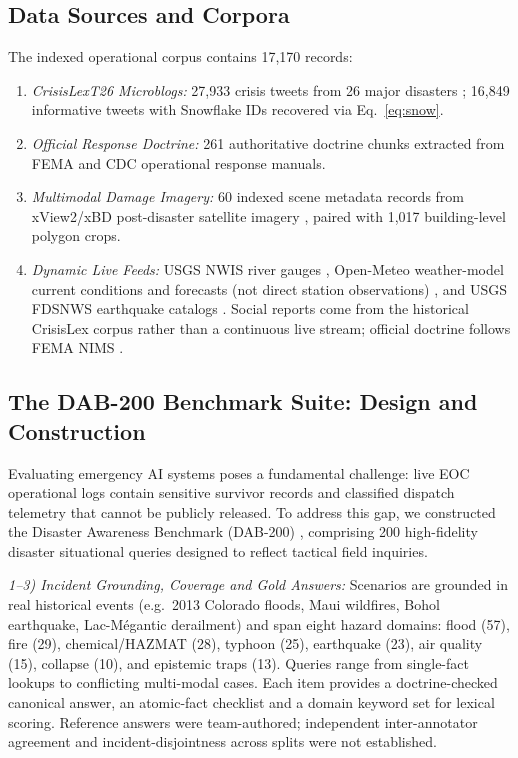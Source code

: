 \documentclass[conference]{IEEEtran}
\begin{document}
\subsection{Data Sources and Corpora}
The indexed operational corpus contains 17,170 records:
\begin{enumerate}
    \item \textit{CrisisLexT26 Microblogs:} 27,933 crisis tweets from 26 major disasters \cite{olteanu2015}; 16,849 informative tweets with Snowflake IDs recovered via Eq.~\eqref{eq:snow}.
    \item \textit{Official Response Doctrine:} 261 authoritative doctrine chunks extracted from FEMA and CDC operational response manuals.
    \item \textit{Multimodal Damage Imagery:} 60 indexed scene metadata records from xView2/xBD post-disaster satellite imagery \cite{xview2}, paired with 1,017 building-level polygon crops.
    \item \textit{Dynamic Live Feeds:} USGS NWIS river gauges \cite{usgsnwis}, Open-Meteo weather-model current conditions and forecasts (not direct station observations) \cite{openmeteo}, and USGS FDSNWS earthquake catalogs \cite{usgsfdsn}. Social reports come from the historical CrisisLex corpus rather than a continuous live stream; official doctrine follows FEMA NIMS \cite{femanims}.
\end{enumerate}

\subsection{The DAB-200 Benchmark Suite: Design and Construction}
Evaluating emergency AI systems poses a fundamental challenge: live EOC operational logs contain sensitive survivor records and classified dispatch telemetry that cannot be publicly released. To address this gap, we constructed the Disaster Awareness Benchmark (DAB-200) \cite{dab200}, comprising 200 high-fidelity disaster situational queries designed to reflect tactical field inquiries.

\textit{1--3) Incident Grounding, Coverage and Gold Answers:} Scenarios are grounded in real historical events (e.g.\ 2013 Colorado floods, Maui wildfires, Bohol earthquake, Lac-M\'{e}gantic derailment) \cite{olteanu2015} and span eight hazard domains: flood (57), fire (29), chemical/HAZMAT (28), typhoon (25), earthquake (23), air quality (15), collapse (10), and epistemic traps (13). Queries range from single-fact lookups to conflicting multi-modal cases. Each item provides a doctrine-checked canonical answer, an atomic-fact checklist and a domain keyword set for lexical scoring. Reference answers were team-authored; independent inter-annotator agreement and incident-disjointness across splits were not established.
\end{document}
